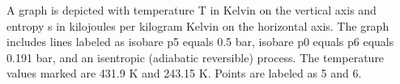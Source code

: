 A graph is depicted with temperature T in Kelvin on the vertical axis and entropy s in kilojoules per kilogram Kelvin on the horizontal axis. The graph includes lines labeled as isobare p5 equals 0.5 bar, isobare p0 equals p6 equals 0.191 bar, and an isentropic (adiabatic reversible) process. The temperature values marked are 431.9 K and 243.15 K. Points are labeled as 5 and 6.